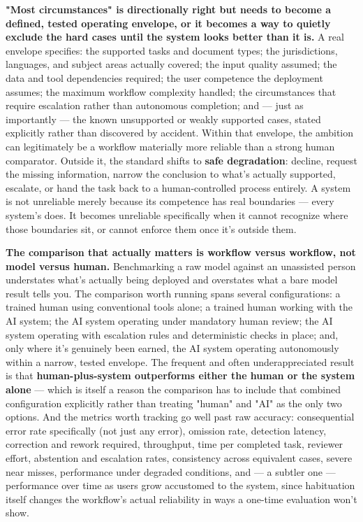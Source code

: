 \textbf{"Most circumstances" is directionally right but needs to become a defined, tested operating envelope, or it becomes a way to quietly exclude the hard cases until the system looks better than it is.} A real envelope specifies: the supported tasks and document types; the jurisdictions, languages, and subject areas actually covered; the input quality assumed; the data and tool dependencies required; the user competence the deployment assumes; the maximum workflow complexity handled; the circumstances that require escalation rather than autonomous completion; and --- just as importantly --- the known unsupported or weakly supported cases, stated explicitly rather than discovered by accident. Within that envelope, the ambition can legitimately be a workflow materially more reliable than a strong human comparator. Outside it, the standard shifts to \textbf{safe degradation}: decline, request the missing information, narrow the conclusion to what's actually supported, escalate, or hand the task back to a human-controlled process entirely. A system is not unreliable merely because its competence has real boundaries --- every system's does. It becomes unreliable specifically when it cannot recognize where those boundaries sit, or cannot enforce them once it's outside them.

\textbf{The comparison that actually matters is workflow versus workflow, not model versus human.} Benchmarking a raw model against an unassisted person understates what's actually being deployed and overstates what a bare model result tells you. The comparison worth running spans several configurations: a trained human using conventional tools alone; a trained human working with the AI system; the AI system operating under mandatory human review; the AI system operating with escalation rules and deterministic checks in place; and, only where it's genuinely been earned, the AI system operating autonomously within a narrow, tested envelope. The frequent and often underappreciated result is that \textbf{human-plus-system outperforms either the human or the system alone} --- which is itself a reason the comparison has to include that combined configuration explicitly rather than treating "human" and "AI" as the only two options. And the metrics worth tracking go well past raw accuracy: consequential error rate specifically (not just any error), omission rate, detection latency, correction and rework required, throughput, time per completed task, reviewer effort, abstention and escalation rates, consistency across equivalent cases, severe near misses, performance under degraded conditions, and --- a subtler one --- performance over time as users grow accustomed to the system, since habituation itself changes the workflow's actual reliability in ways a one-time evaluation won't show.

